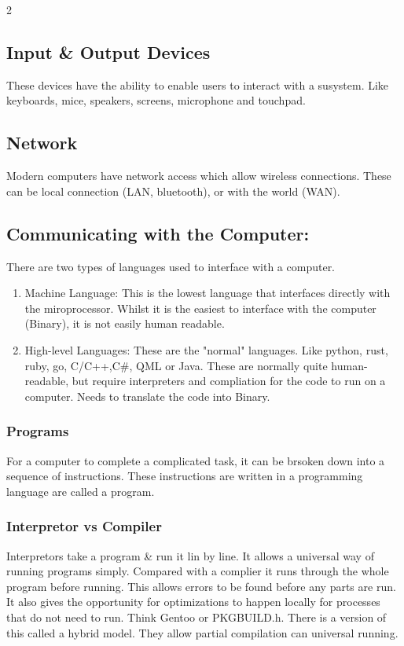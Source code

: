 \documentclass[a4paper]{report}
\begin{document}
\begin{flushleft}
\begin{multicols}{2}
	\subsection*{Input \& Output Devices}
	These devices have the ability to enable users to interact with a susystem. Like keyboards, mice, speakers, screens, microphone and touchpad.

	\subsection*{Network}
	Modern computers have network access which allow wireless connections. These can be local connection (LAN, bluetooth), or with the world (WAN).

	\subsection*{Communicating with the Computer:}
	There are two types of languages used to interface with a computer.
	\begin{enumerate}
		\item Machine Language: This is the lowest language that interfaces directly with the miroprocessor. Whilst it is the easiest to interface with the computer (Binary), it is not easily human readable.
		\item High-level Languages: These are the "normal" languages. Like python, rust, ruby, go, C/C++,C\#, QML or Java. These are normally quite human-readable, but require interpreters and compliation for the code to run on a computer. Needs to translate the code into Binary.
	\end{enumerate}

	\subsubsection*{Programs}
	For a computer to complete a complicated task, it can be brsoken down into a sequence of instructions. These instructions are written in a programming language are called a program.

	\subsubsection*{Interpretor vs Compiler}
	Interpretors take a program \& run it lin by line. It allows a universal way of running programs simply. Compared with a complier it runs through the whole program before running. This allows errors to be found before any parts are run. It also gives the opportunity for optimizations to happen locally for processes that do not need to run. Think Gentoo or PKGBUILD.h. There is a version of this called a hybrid model. They allow partial compilation can universal running.


\end{multicols}
\end{flushleft}
\end{document}
